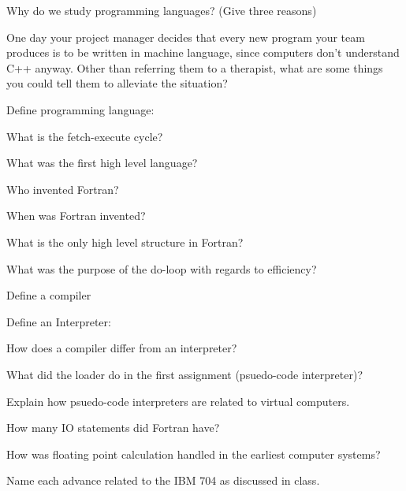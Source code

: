 \documentclass{exam} %
\newcommand{\spacedQuestion}[2][1] {
  \question
  {#2}
  \vspace{\stretch{#1}}
}
\begin{document}
\begin{questions}

  \spacedQuestion {
    Why do we study programming languages? (Give three reasons)
  }


  \spacedQuestion {
    One day your project manager decides that every new program your team produces is to be written in machine language, since computers don't understand C++ anyway. Other than referring them to a therapist, what are some things you could tell them to alleviate the situation?
  }

  \spacedQuestion { Define programming language: }

  \spacedQuestion { What is the fetch-execute cycle? }

  \spacedQuestion { What was the first high level language? }

  \spacedQuestion { Who invented Fortran? }

  \spacedQuestion { When was Fortran invented? }

  \spacedQuestion { What is the only high level structure in Fortran? }

  \spacedQuestion { What was the purpose of the do-loop with regards to efficiency? }

  \spacedQuestion { Define a compiler }

  \pagebreak

  \question Define an Interpreter:

  \question How does a compiler differ from an interpreter?

  \question What did the loader do in the first assignment (psuedo-code interpreter)?

  \question Explain how psuedo-code interpreters are related to virtual computers.

  \question How many IO statements did Fortran have?

  \question How was floating point calculation handled in the earliest computer systems?

  \question Name each advance related to the IBM 704 as discussed in class.


\end{questions}
\end{document}

